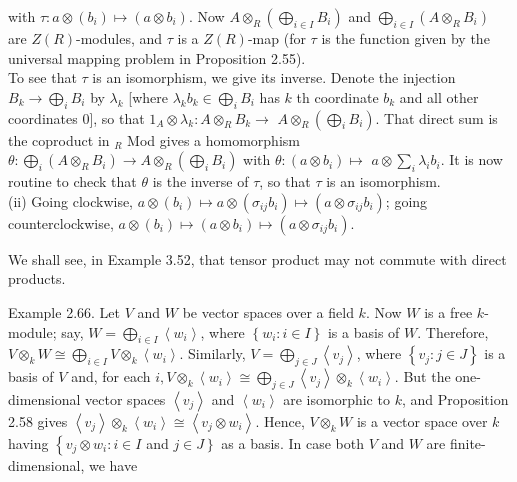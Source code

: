 \documentclass[10pt, letterpaper]{article}
\begin{document}
with $\tau: a \otimes\left(b_{i}\right) \mapsto\left(a \otimes b_{i}\right)$. Now $A \otimes_{R}\left(\bigoplus_{i \in I} B_{i}\right)$ and $\bigoplus_{i \in I}\left(A \otimes_{R} B_{i}\right)$ are $Z(R)$-modules, and $\tau$ is a $Z(R)$-map (for $\tau$ is the function given by the universal mapping problem in Proposition 2.55).\\
To see that $\tau$ is an isomorphism, we give its inverse. Denote the injection $B_{k} \rightarrow \bigoplus_{i} B_{i}$ by $\lambda_{k}$ [where $\lambda_{k} b_{k} \in \bigoplus_{i} B_{i}$ has $k$ th coordinate $b_{k}$ and all other coordinates 0], so that $1_{A} \otimes \lambda_{k}: A \otimes_{R} B_{k} \rightarrow$ $A \otimes_{R}\left(\bigoplus_{i} B_{i}\right)$. That direct sum is the coproduct in ${ }_{R}$ Mod gives a homomorphism $\theta: \bigoplus_{i}\left(A \otimes_{R} B_{i}\right) \rightarrow A \otimes_{R}\left(\bigoplus_{i} B_{i}\right)$ with $\theta:\left(a \otimes b_{i}\right) \mapsto$ $a \otimes \sum_{i} \lambda_{i} b_{i}$. It is now routine to check that $\theta$ is the inverse of $\tau$, so that $\tau$ is an isomorphism.\\
(ii) Going clockwise, $a \otimes\left(b_{i}\right) \mapsto a \otimes\left(\sigma_{i j} b_{i}\right) \mapsto\left(a \otimes \sigma_{i j} b_{i}\right)$; going counterclockwise, $a \otimes\left(b_{i}\right) \mapsto\left(a \otimes b_{i}\right) \mapsto\left(a \otimes \sigma_{i j} b_{i}\right)$.

We shall see, in Example 3.52, that tensor product may not commute with direct products.

Example 2.66. Let $V$ and $W$ be vector spaces over a field $k$. Now $W$ is a free $k$-module; say, $W=\bigoplus_{i \in I}\left\langle w_{i}\right\rangle$, where $\left\{w_{i}: i \in I\right\}$ is a basis of $W$. Therefore, $V \otimes_{k} W \cong \bigoplus_{i \in I} V \otimes_{k}\left\langle w_{i}\right\rangle$. Similarly, $V=\bigoplus_{j \in J}\left\langle v_{j}\right\rangle$, where $\left\{v_{j}: j \in J\right\}$ is a basis of $V$ and, for each $i, V \otimes_{k}\left\langle w_{i}\right\rangle \cong \bigoplus_{j \in J}\left\langle v_{j}\right\rangle \otimes_{k}\left\langle w_{i}\right\rangle$. But the one-dimensional vector spaces $\left\langle v_{j}\right\rangle$ and $\left\langle w_{i}\right\rangle$ are isomorphic to $k$, and Proposition 2.58 gives $\left\langle v_{j}\right\rangle \otimes_{k}\left\langle w_{i}\right\rangle \cong\left\langle v_{j} \otimes w_{i}\right\rangle$. Hence, $V \otimes_{k} W$ is a vector space over $k$ having $\left\{v_{j} \otimes w_{i}: i \in I\right.$ and $\left.j \in J\right\}$ as a basis. In case both $V$ and $W$ are finite-dimensional, we have
\end{document}
